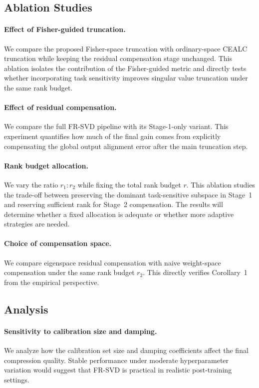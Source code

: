 \documentclass[a4paper,fleqn]{cas-dc}
\begin{document}
\subsection{Ablation Studies}

\paragraph{Effect of Fisher-guided truncation.}
We compare the proposed Fisher-space truncation with ordinary-space CEALC truncation while keeping the residual compensation stage unchanged. This ablation isolates the contribution of the Fisher-guided metric and directly tests whether incorporating task sensitivity improves singular value truncation under the same rank budget.

\paragraph{Effect of residual compensation.}
We compare the full FR-SVD pipeline with its Stage-1-only variant. This experiment quantifies how much of the final gain comes from explicitly compensating the global output alignment error after the main truncation step.

\paragraph{Rank budget allocation.}
We vary the ratio $r_1:r_2$ while fixing the total rank budget $r$. This ablation studies the trade-off between preserving the dominant task-sensitive subspace in Stage~1 and reserving sufficient rank for Stage~2 compensation. The results will determine whether a fixed allocation is adequate or whether more adaptive strategies are needed.

\paragraph{Choice of compensation space.}
We compare eigenspace residual compensation with naive weight-space compensation under the same rank budget $r_2$. This directly verifies Corollary~1 from the empirical perspective.

\subsection{Analysis}

\paragraph{Sensitivity to calibration size and damping.}
We analyze how the calibration set size and damping coefficients affect the final compression quality. Stable performance under moderate hyperparameter variation would suggest that FR-SVD is practical in realistic post-training settings.
\end{document}
